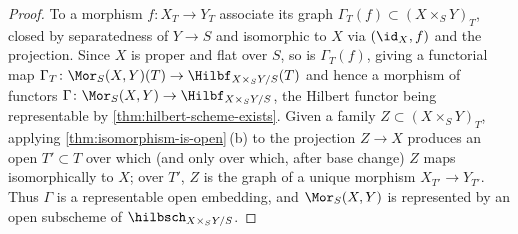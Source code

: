\begin{proof}
  To a morphism $f\colon X_T\to Y_T$ associate its graph
  $\Gamma_T(f)\subset (X\times_S Y)_T$, closed by separatedness of $Y\to S$ and
  isomorphic to $X$ via $(\id_X,f)$ and the projection. Since $X$ is proper and
  flat over $S$, so is $\Gamma_T(f)$, giving a functorial map
  $\Gamma_T\colon \Mor_S(X,Y)(T)\to \Hilbf_{X\times_S Y/S}(T)$ and hence a
  morphism of functors $\Gamma\colon \Mor_S(X,Y)\to \Hilbf_{X\times_S Y/S}$, the
  Hilbert functor being representable by \cref{thm:hilbert-scheme-exists}. Given a
  family $Z\subset (X\times_S Y)_T$, applying \cref{thm:isomorphism-is-open}\,(b)
  to the projection $Z\to X$ produces an open $T'\subset T$ over which (and only
  over which, after base change) $Z$ maps isomorphically to $X$; over $T'$, $Z$ is
  the graph of a unique morphism $X_{T'}\to Y_{T'}$. Thus $\Gamma$ is a
  representable open embedding, and $\Mor_S(X,Y)$ is represented by an open
  subscheme of $\hilbsch_{X\times_S Y/S}$.
\end{proof}

